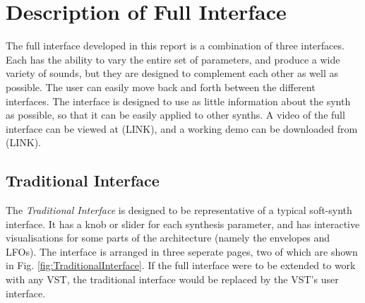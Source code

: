 \documentclass[11pt, oneside]{report}   	%
\begin{document}
\chapter{Description of Full Interface}
The full interface developed in this report is a combination of three interfaces. Each has the ability to vary the entire set of parameters, and produce a wide variety of sounds, but they are designed to complement each other as well as possible. The user can easily move back and forth between the different interfaces. The interface is designed to use as little information about the synth as possible, so that it can be easily applied to other synths. A video of the full interface can be viewed at (LINK), and a working demo can be downloaded from (LINK).
\section{Traditional Interface}
The \emph{Traditional Interface} is designed to be representative of a typical soft-synth interface. It has a knob or slider for each synthesis parameter, and has interactive visualisations for some parts of the architecture (namely the envelopes and LFOs). The interface is arranged in three seperate pages, two of which are shown in Fig. \ref{fig:TraditionalInterface}. 
If the full interface were to be extended to work with any VST, the traditional interface would be replaced by the VST's user interface. 
\end{document}
